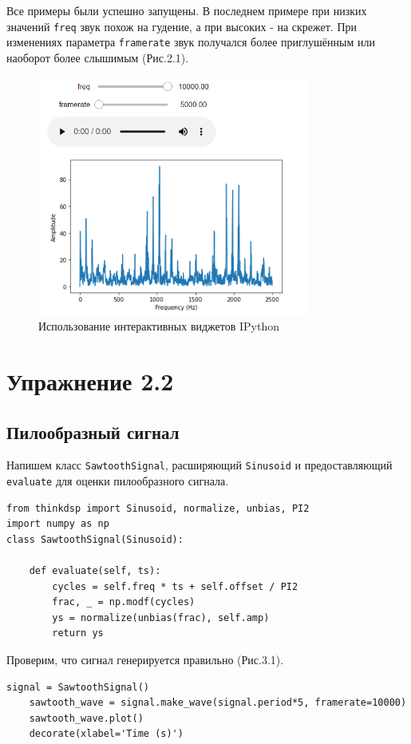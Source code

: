 \documentclass[a4paper,12pt]{report}
\begin{document}
    Все примеры были успешно запущены. В последнем примере при низких значений \texttt{freq} звук похож на гудение, а при высоких - на скрежет. При изменениях параметра \texttt{framerate} звук получался более приглушённым или наоборот более слышимым (Рис.2.1).
\begin{figure}[H]
        \centering
        \includegraphics[width=0.8\textwidth]{fig2-1.PNG}
        \caption{Использование интерактивных виджетов IPython}
        \label{fig:fig2-1}
\end{figure}

\chapter{Упражнение 2.2}
\section{Пилообразный сигнал}
    Напишем класс \texttt{SawtoothSignal}, расширяющий \texttt{Sinusoid} и предоставляющий \texttt{evaluate} для оценки пилообразного сигнала.
    
\begin{lstlisting}[caption=Класс пилообразного сигнала]
from thinkdsp import Sinusoid, normalize, unbias, PI2
import numpy as np
class SawtoothSignal(Sinusoid):

    def evaluate(self, ts):
        cycles = self.freq * ts + self.offset / PI2
        frac, _ = np.modf(cycles)
        ys = normalize(unbias(frac), self.amp)
        return ys
\end{lstlisting} 
    
    Проверим, что сигнал генерируется правильно (Рис.3.1).
\begin{lstlisting}[caption=Генерация пилообразного сигнала]
    signal = SawtoothSignal()
    sawtooth_wave = signal.make_wave(signal.period*5, framerate=10000)
    sawtooth_wave.plot()
    decorate(xlabel='Time (s)')
\end{lstlisting}  
\end{document}
